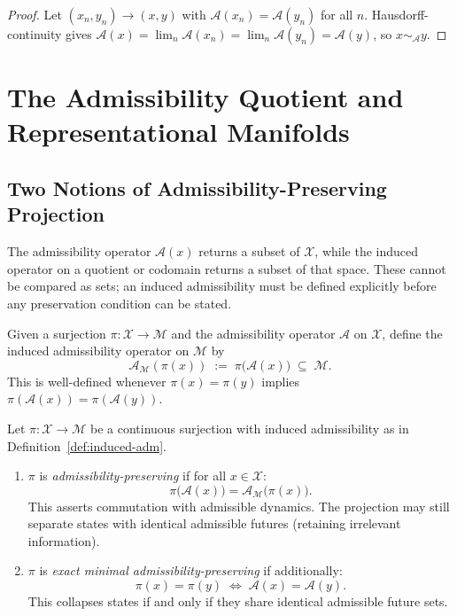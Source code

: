 \documentclass[12pt, a4paper, oneside]{book}
\newcommand{\Adm}{\mathcal{A}}
\newcommand{\X}{\mathcal{X}}
\newcommand{\M}{\mathcal{M}}
\newcommand{\proj}{\pi}
\newcommand{\SA}{{\sim_{\!\Adm}}}
\begin{document}
\begin{proof}
Let $(x_n, y_n) \to (x,y)$ with $\Adm(x_n) = \Adm(y_n)$ for all $n$.
Hausdorff-continuity gives $\Adm(x) = \lim_n \Adm(x_n) = \lim_n \Adm(y_n)
= \Adm(y)$, so $x \SA y$.
\end{proof}

\chapter{The Admissibility Quotient and Representational Manifolds}
\label{ch:quotient}

\section{Two Notions of Admissibility-Preserving Projection}

The admissibility operator $\Adm(x)$ returns a subset of $\X$, while
the induced operator on a quotient or codomain returns a subset of that
space. These cannot be compared as sets; an induced admissibility must
be defined explicitly before any preservation condition can be stated.

\begin{definition}
\label{def:induced-adm}
Given a surjection $\proj : \X \to \M$ and the admissibility operator
$\Adm$ on $\X$, define the induced admissibility operator on $\M$ by
\[
  \Adm_\M(\proj(x)) \;:=\; \proj\bigl(\Adm(x)\bigr) \;\subseteq\; \M.
\]
This is well-defined whenever $\proj(x) = \proj(y)$ implies
$\proj(\Adm(x)) = \proj(\Adm(y))$.
\end{definition}

\begin{definition}
\label{def:proj-types}
Let $\proj : \X \to \M$ be a continuous surjection with induced
admissibility as in Definition~\ref{def:induced-adm}.

\begin{enumerate}
\item $\proj$ is \emph{admissibility-preserving} if for all $x \in \X$:
  \[
    \proj\bigl(\Adm(x)\bigr) = \Adm_\M\bigl(\proj(x)\bigr).
  \]
  This asserts commutation with admissible dynamics. The projection may
  still separate states with identical admissible futures (retaining
  irrelevant information).

\item $\proj$ is \emph{exact minimal admissibility-preserving} if
  additionally:
  \[
    \proj(x) = \proj(y) \;\iff\; \Adm(x) = \Adm(y).
  \]
  This collapses states if and only if they share identical admissible
  future sets.
\end{enumerate}
\end{definition}
\end{document}
